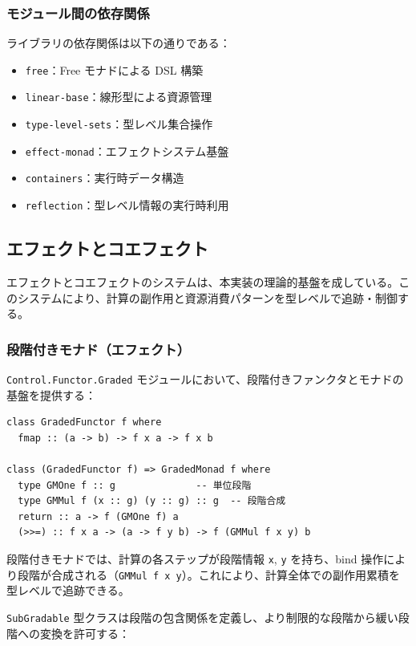 \subsubsection{モジュール間の依存関係}

ライブラリの依存関係は以下の通りである：
\begin{itemize}
\item \texttt{free}：Free モナドによる DSL 構築
\item \texttt{linear-base}：線形型による資源管理
\item \texttt{type-level-sets}：型レベル集合操作
\item \texttt{effect-monad}：エフェクトシステム基盤
\item \texttt{containers}：実行時データ構造
\item \texttt{reflection}：型レベル情報の実行時利用
\end{itemize}

\subsection{エフェクトとコエフェクト}
\label{sect:impl-eff-coeff}

エフェクトとコエフェクトのシステムは、本実装の理論的基盤を成している。このシステムにより、計算の副作用と資源消費パターンを型レベルで追跡・制御する。

\subsubsection{段階付きモナド（エフェクト）}

\texttt{Control.Functor.Graded} モジュールにおいて、段階付きファンクタとモナドの基盤を提供する：

\begin{verbatim}
class GradedFunctor f where
  fmap :: (a -> b) -> f x a -> f x b

class (GradedFunctor f) => GradedMonad f where
  type GMOne f :: g              -- 単位段階
  type GMMul f (x :: g) (y :: g) :: g  -- 段階合成
  return :: a -> f (GMOne f) a
  (>>=) :: f x a -> (a -> f y b) -> f (GMMul f x y) b
\end{verbatim}

段階付きモナドでは、計算の各ステップが段階情報 \texttt{x}, \texttt{y} を持ち、bind 操作により段階が合成される（\texttt{GMMul f x y}）。これにより、計算全体での副作用累積を型レベルで追跡できる。

\texttt{SubGradable} 型クラスは段階の包含関係を定義し、より制限的な段階から緩い段階への変換を許可する：

